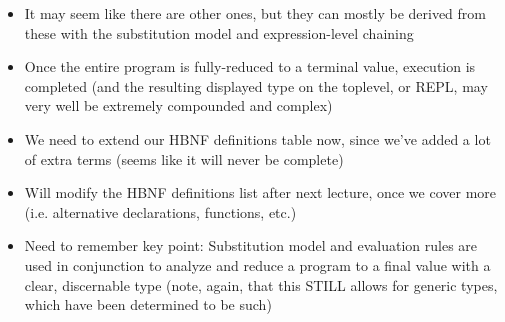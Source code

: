 \begin{itemize}
\begin{enumerate}
    \end{enumerate}
    \item It may seem like there are other ones, but they can mostly be derived from these with the substitution model and expression-level chaining
    \item Once the entire program is fully-reduced to a terminal value, execution is completed (and the resulting displayed type on the toplevel, or REPL, may very well be extremely compounded and complex)
    \item We need to extend our HBNF definitions table now, since we've added a lot of extra terms (seems like it will never be complete)
    \item Will modify the HBNF definitions list after next lecture, once we cover more (i.e. alternative declarations, functions, etc.)
    \item Need to remember key point: Substitution model and evaluation rules are used in conjunction to analyze and reduce a program to a final value with a clear, discernable type (note, again, that this STILL allows for generic types, which have been determined to be such)
\end{itemize}
